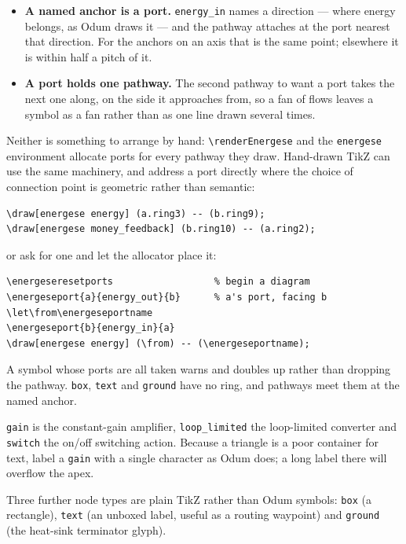 \documentclass{article}
\begin{document}
\begin{itemize}
\item \textbf{A named anchor is a port.} \texttt{energy\_in} names a direction
--- where energy belongs, as Odum draws it --- and the pathway attaches at the
port nearest that direction. For the anchors on an axis that is the same point;
elsewhere it is within half a pitch of it.
\item \textbf{A port holds one pathway.} The second pathway to want a port
takes the next one along, on the side it approaches from, so a fan of flows
leaves a symbol as a fan rather than as one line drawn several times.
\end{itemize}

Neither is something to arrange by hand: \verb|\renderEnergese| and the
\texttt{energese} environment allocate ports for every pathway they draw.
Hand-drawn TikZ can use the same machinery, and address a port directly where
the choice of connection point is geometric rather than semantic:

\begin{verbatim}
\draw[energese energy] (a.ring3) -- (b.ring9);
\draw[energese money_feedback] (b.ring10) -- (a.ring2);
\end{verbatim}

\noindent or ask for one and let the allocator place it:

\begin{verbatim}
\energeseresetports                  % begin a diagram
\energeseport{a}{energy_out}{b}      % a's port, facing b
\let\from\energeseportname
\energeseport{b}{energy_in}{a}
\draw[energese energy] (\from) -- (\energeseportname);
\end{verbatim}

\noindent A symbol whose ports are all taken warns and doubles up rather than
dropping the pathway. \texttt{box}, \texttt{text} and \texttt{ground} have no
ring, and pathways meet them at the named anchor.

\texttt{gain} is the constant-gain amplifier, \texttt{loop\_limited} the
loop-limited converter and \texttt{switch} the on/off switching action. Because
a triangle is a poor container for text, label a \texttt{gain} with a single
character as Odum does; a long label there will overflow the apex.

Three further node types are plain TikZ rather than Odum symbols:
\texttt{box} (a rectangle), \texttt{text} (an unboxed label, useful as a routing
waypoint) and \texttt{ground} (the heat-sink terminator glyph).
\end{document}
